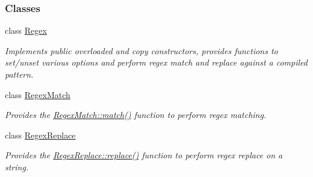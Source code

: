 \subsubsection*{Classes}
\begin{DoxyCompactItemize}
\item 
class \hyperlink{classjpcre2_1_1Regex}{Regex}
\begin{DoxyCompactList}\small\item\em Implements public overloaded and copy constructors, provides functions to set/unset various options and perform regex match and replace against a compiled pattern. \end{DoxyCompactList}\item 
class \hyperlink{classjpcre2_1_1RegexMatch}{Regex\+Match}
\begin{DoxyCompactList}\small\item\em Provides the \hyperlink{classjpcre2_1_1RegexMatch_a5868aef3a146594ea1ebef34d122bb33_a5868aef3a146594ea1ebef34d122bb33}{Regex\+Match\+::match()} function to perform regex matching. \end{DoxyCompactList}\item 
class \hyperlink{classjpcre2_1_1RegexReplace}{Regex\+Replace}
\begin{DoxyCompactList}\small\item\em Provides the \hyperlink{classjpcre2_1_1RegexReplace_afd087fa7a9bfedec802d1a3dd7edbdd0_afd087fa7a9bfedec802d1a3dd7edbdd0}{Regex\+Replace\+::replace()} function to perform regex replace on a string. \end{DoxyCompactList}\end{DoxyCompactItemize}
